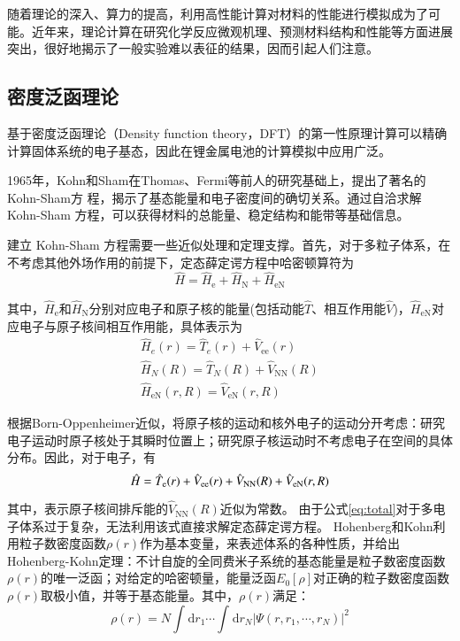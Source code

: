随着理论的深入、算力的提高，利用高性能计算对材料的性能进行模拟成为了可能。近年来，理论计算在研究化学反应微观机理、预测材料结构和性能等方面进展突出，很好地揭示了一般实验难以表征的结果，因而引起人们注意。

\subsection{密度泛函理论}

基于密度泛函理论（Density function theory，DFT）的第一性原理计算可以精确计算固体系统的电子基态，因此在锂金属电池的计算模拟中应用广泛。

1965年，Kohn和Sham在Thomas、Fermi等前人的研究基础上，提出了著名的 Kohn-Sham方 程，揭示了基态能量和电子密度间的确切关系。通过自洽求解 Kohn-Sham 方程，可以获得材料的总能量、稳定结构和能带等基础信息。

建立 Kohn-Sham 方程需要一些近似处理和定理支撑。首先，对于多粒子体系，在不考虑其他外场作用的前提下，定态薛定谔方程中哈密顿算符为
\begin{equation}
    \hat{H}=\hat{H}_{\mathrm{e}}+\hat{H}_{\mathrm{N}}+\hat{H}_{\mathrm{eN}}
\end{equation}

其中，$\hat{H}_{\mathrm{e}}$和$\hat{H}_{\mathrm{N}}$分别对应电子和原子核的能量(包括动能$\hat{T}$、相互作用能$\hat{V}$)，$\hat{H}_{\mathrm{eN}}$对应电子与原子核间相互作用能，具体表示为
\begin{gather}
    \hat{H}_e(r) = \hat{T}_e(r)+\hat{V}_{\mathrm{ee}}(r) \\
    \hat{H}_N(R) = \hat{T}_N(R)+\hat{V}_{\mathrm{NN}}(R) \\ 
    \hat{H}_{\mathrm{eN}}(r,R) = \mathrm{ }\hat{V}_{\mathrm{eN}}(r,R) 
\end{gather}

根据Born-Oppenheimer近似，将原子核的运动和核外电子的运动分开考虑：研究电子运动时原子核处于其瞬时位置上；研究原子核运动时不考虑电子在空间的具体分布。因此，对于电子，有
\begin{equation}{\label{eq:total}}
    \hat{H}=\hat{T}_{\mathrm{e}}(r)+\hat{V}_{\mathrm{ee}}(r)+\hat{V}_{\mathrm{NN}}(R)+\hat{V}_{\mathrm{eN}}(r,R)
\end{equation}

其中，表示原子核间排斥能的$\hat{V}_{\mathrm{NN}}(R)$近似为常数。
由于公式\ref{eq:total}对于多电子体系过于复杂，无法利用该式直接求解定态薛定谔方程。
Hohenberg和Kohn利用粒子数密度函数$\rho(r)$作为基本变量，来表述体系的各种性质，并给出Hohenberg-Kohn定理：不计自旋的全同费米子系统的基态能量是粒子数密度函数$\rho(r)$的唯一泛函；对给定的哈密顿量，能量泛函$E_0[\rho]$对正确的粒子数密度函数$\rho(r)$取极小值，并等于基态能量。其中，$\rho(r)$满足：
\begin{equation}
    \rho(r)=N\int_{}^{}\mathrm{d}r_1 \cdots \int_{}^{}\mathrm{d}r_N | \Psi (r,r_1,\cdots,r_N) |^2
\end{equation}

